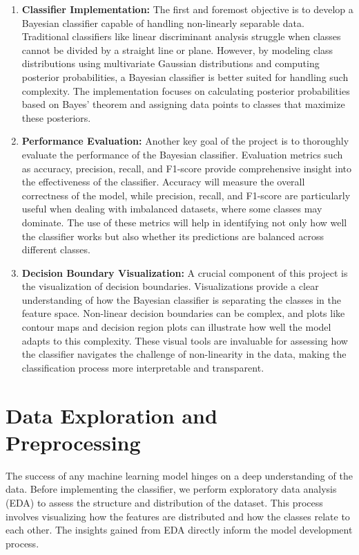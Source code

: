 \documentclass[conference]{IEEEtran}
\begin{document}
	\begin{enumerate}
		\item \textbf{Classifier Implementation:} The first and foremost objective is to develop a Bayesian classifier capable of handling non-linearly separable data. Traditional classifiers like linear discriminant analysis struggle when classes cannot be divided by a straight line or plane. However, by modeling class distributions using multivariate Gaussian distributions and computing posterior probabilities, a Bayesian classifier is better suited for handling such complexity. The implementation focuses on calculating posterior probabilities based on Bayes' theorem and assigning data points to classes that maximize these posteriors.
		
		\item \textbf{Performance Evaluation:} Another key goal of the project is to thoroughly evaluate the performance of the Bayesian classifier. Evaluation metrics such as accuracy, precision, recall, and F1-score provide comprehensive insight into the effectiveness of the classifier. Accuracy will measure the overall correctness of the model, while precision, recall, and F1-score are particularly useful when dealing with imbalanced datasets, where some classes may dominate. The use of these metrics will help in identifying not only how well the classifier works but also whether its predictions are balanced across different classes.
		
		\item \textbf{Decision Boundary Visualization:} A crucial component of this project is the visualization of decision boundaries. Visualizations provide a clear understanding of how the Bayesian classifier is separating the classes in the feature space. Non-linear decision boundaries can be complex, and plots like contour maps and decision region plots can illustrate how well the model adapts to this complexity. These visual tools are invaluable for assessing how the classifier navigates the challenge of non-linearity in the data, making the classification process more interpretable and transparent.
	\end{enumerate}
	
	\section{Data Exploration and Preprocessing}
	
	The success of any machine learning model hinges on a deep understanding of the data. Before implementing the classifier, we perform exploratory data analysis (EDA) to assess the structure and distribution of the dataset. This process involves visualizing how the features are distributed and how the classes relate to each other. The insights gained from EDA directly inform the model development process.
	
\end{document}
